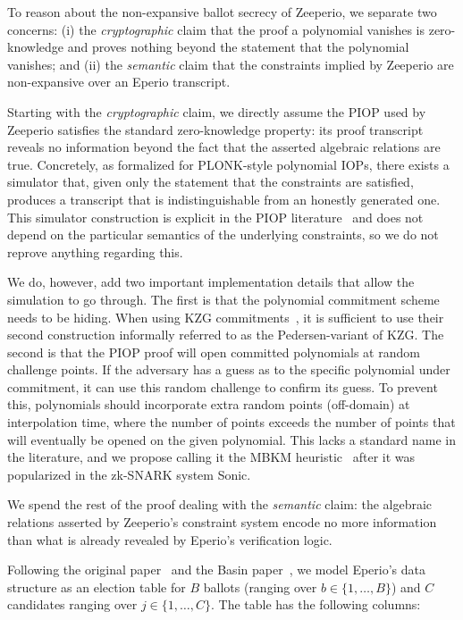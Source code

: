 To reason about the non-expansive ballot secrecy of Zeeperio, we separate two concerns: (i) the \emph{cryptographic} claim that the proof a polynomial vanishes is zero-knowledge and proves nothing beyond the statement that the polynomial vanishes; and (ii) the \emph{semantic} claim that the constraints implied by Zeeperio are non-expansive over an Eperio transcript.

Starting with the \emph{cryptographic} claim, we directly assume the PIOP used by Zeeperio satisfies the standard zero-knowledge property: its proof transcript reveals no information beyond the fact that the asserted algebraic relations are true. Concretely, as formalized for PLONK-style polynomial IOPs, there exists a simulator that, given only the statement that the constraints are satisfied, produces a transcript that is indistinguishable from an honestly generated one. This simulator construction is explicit in the PIOP literature~\cite{Sef24,Lip25} and does not depend on the particular semantics of the underlying constraints, so we do not reprove anything regarding this.

We do, however, add two important implementation details that allow the simulation to go through. The first is that the polynomial commitment scheme needs to be hiding. When using KZG commitments~\cite{KZG10}, it is sufficient to use their second construction informally referred to as the Pedersen-variant of KZG. The second is that the PIOP proof will open committed polynomials at random challenge points. If the adversary has a guess as to the specific polynomial under commitment, it can use this random challenge to confirm its guess. To prevent this, polynomials should incorporate extra random points (off-domain) at interpolation time, where the number of points exceeds the number of points that will eventually be opened on the given polynomial. This lacks a standard name in the literature, and we propose calling it the MBKM heuristic~\cite{MBKM19} after it was popularized in the zk-SNARK system Sonic.

We spend the rest of the proof dealing with the \emph{semantic} claim: the algebraic relations asserted by Zeeperio’s constraint system encode no more information than what is already revealed by Eperio’s verification logic.

Following the original paper~\cite{ECHA10} and the Basin \etal paper~\cite{BDGR21}, we model Eperio's data structure as an election table for $B$ ballots (ranging over  $b \in \{1,\dots,B\}$) and $C$ candidates ranging over $j \in \{1,\dots,C\}$. The table has the following columns:

